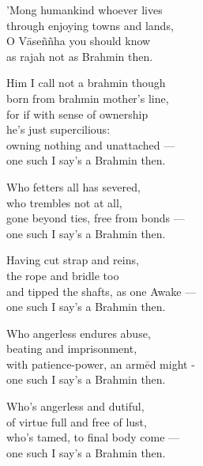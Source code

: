 \begin{MyDescription}{}
'Mong humankind whoever lives\\
through enjoying towns and lands,\\
O V\=ase\~n\~nha you should know\\
as rajah not as Brahmin then.
\end{MyDescription}

\begin{MyDescription}{}
Him I call not a brahmin though\\
born from brahmin mother's line,\\
for if with sense of ownership\\
he's just supercilious:\\
owning nothing and unattached —\\
one such I say's a Brahmin then.
\end{MyDescription}

\begin{MyDescription}{}
Who fetters all has severed,\\
who trembles not at all,\\
gone beyond ties, free from bonds —\\
one such I say's a Brahmin then.
\end{MyDescription}

\begin{MyDescription}{}
Having cut strap and reins,\\
the rope and bridle too\\
and tipped the shafts, as one Awake —\\
one such I say's a Brahmin then.
\end{MyDescription}

\begin{MyDescription}{}
Who angerless endures abuse,\\
beating and imprisonment,\\
with patience-power, an arm\=ed might -\\
one such I say's a Brahmin then.
\end{MyDescription}

\begin{MyDescription}{}
Who's angerless and dutiful,\\
of virtue full and free of lust,\\
who's tamed, to final body come —\\
one such I say's a Brahmin then.
\end{MyDescription}

